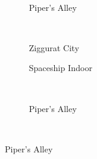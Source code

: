 \begin{figure}[t]
\begin{minipage}[t]{0.5\textwidth}
\begin{adjustbox}{minipage=\textwidth, scale=0.55}
\begin{subfigure}[b]{1.6\textwidth}
      \label{fig:hs-ns-sum:exec:indoor}
    \end{subfigure}
  \end{adjustbox} \\
  \begin{adjustbox}{minipage=\textwidth, scale=0.55}
    \begin{subfigure}[b]{1.6\textwidth}
      \centering
      \def\svgwidth{\textwidth}
      
      \caption{Piper's Alley}
      \vspace{4pt}
      \label{fig:hs-ns-sum:exec:alley}
    \end{subfigure}
  \end{adjustbox} \\
  \begin{adjustbox}{minipage=\textwidth, scale=0.55}
    \begin{subfigure}[b]{1.6\textwidth}
      \centering
      \def\svgwidth{\textwidth}
      
      \caption{Ziggurat City}
      \label{fig:hs-ns-sum:exec:city}
    \end{subfigure}
  \end{adjustbox}
  \caption{\small Aantal pixels.}
  \label{fig:hs-ns-sum:exec}
  \end{minipage}%
  \begin{minipage}[t]{0.5\textwidth}
  \begin{adjustbox}{minipage=\textwidth, scale=0.55}
    \begin{subfigure}[b]{1.6\textwidth}
      \centering
      \def\svgwidth{\textwidth}
      
      \caption{Spaceship Indoor}
      \vspace{4pt}
      \label{fig:hs-ns-sum:lc:indoor}
    \end{subfigure}
  \end{adjustbox} \\
  \begin{adjustbox}{minipage=\textwidth, scale=0.55}
    \begin{subfigure}[b]{1.6\textwidth}
      \centering
      \def\svgwidth{\textwidth}
      
      \caption{Piper's Alley}
      \vspace{4pt}
      \label{fig:hs-ns-sum:lc:alley}
    \end{subfigure}
  \end{adjustbox} \\

\end{minipage}
\end{figure}
